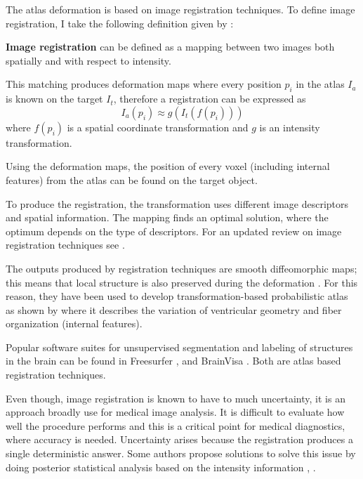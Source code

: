 The atlas deformation is based on image registration techniques.
To define image registration, I take the following definition given by \cite{brown1992survey}:

\begin{definition}
 \textbf{Image registration} can be defined as a mapping between two images both
 spatially and with respect to intensity.
\end{definition}

This matching produces deformation maps where every position $p_i$
in the atlas $I_a$ is known on the target $I_t$, therefore 
a registration can be expressed as
\begin{equation}
 I_a(p_i) \approx g(I_t(f(p_i)))
\end{equation}
where $f(p_i)$ is a spatial coordinate transformation
and $g$ is an intensity transformation.

Using the deformation maps, the position of every voxel 
(including internal features) from the atlas can be found on 
the target object. 

To produce the registration, the transformation uses different image descriptors and spatial information. 
The mapping finds an optimal solution, where the optimum depends on the type of descriptors.
For an updated review on image registration techniques see \cite{wyawahare2009image}.

The outputs produced by registration techniques are smooth diffeomorphic maps; 
this means that local structure is also preserved during the deformation \cite{narayanan2005diffeomorphic}. 
For this reason, they have been used to develop transformation-based
probabilistic atlas as shown by \cite{cao2005large} where it describes the variation of ventricular geometry 
and fiber organization (internal features).

Popular software suites for unsupervised segmentation and labeling of structures in the brain
can be found in Freesurfer \cite{fischl2002whole}, \cite{fischl2004automatically} and 
BrainVisa \cite{pohl07_3}. Both are atlas based registration techniques. 

Even though, image registration is known to have to much uncertainty,
it is an approach broadly use for medical image analysis. 
It is difficult to evaluate how well the procedure performs and this is  
a critical point for medical diagnostics, where accuracy is needed. 
Uncertainty arises because the registration produces a single deterministic answer.
Some authors propose solutions to solve this issue by doing posterior statistical analysis 
based on the intensity information \cite{kybic2010bootstrap}, \cite{simonson2011image}.

